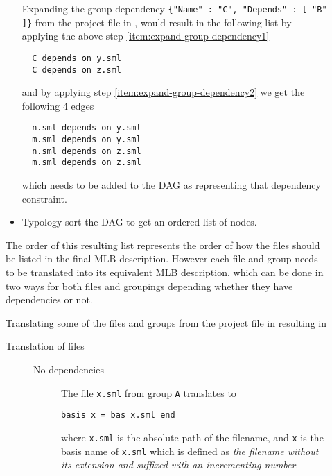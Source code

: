 \begin{description}
\begin{itemize}
    Expanding the group dependency \texttt{\{"Name" : "C", "Depends" : [ "B" ]\}}
    from the project file in , would
    result in the following list by applying the above step
    \ref{item:expand-group-dependency1}

\begin{lstlisting}
  C depends on y.sml
  C depends on z.sml
\end{lstlisting}

  and by applying step \ref{item:expand-group-dependency2} we get the following
  4 edges

  \begin{lstlisting}
  n.sml depends on y.sml
  m.sml depends on y.sml
  n.sml depends on z.sml
  m.sml depends on z.sml
  \end{lstlisting}

  which needs to be added to the DAG as representing that dependency constraint.

  \item Typology sort the DAG to get an ordered list of nodes. 
  \end{itemize}

  The order of this resulting list represents the order of how the files should
  be listed in the final MLB description. However each file and group needs to
  be translated into its equivalent MLB description, which can be done in two
  ways for both files and groupings depending whether they have dependencies or
  not.

  Translating some of the files and groups from the project file in
   resulting in

  \begin{description}

  \item[Translation of files] 

    \begin{description}

    \item[No dependencies] 
      
      The file \texttt{x.sml} from group \texttt{A} translates to 

\begin{lstlisting}
basis x = bas x.sml end      
\end{lstlisting}

      where \texttt{x.sml} is the absolute path of the filename, and \texttt{x}
      is the basis name of \texttt{x.sml} which is defined as \textit{the filename without its
        extension and suffixed with an incrementing number}.



\end{description}
\end{description}
\end{description}
